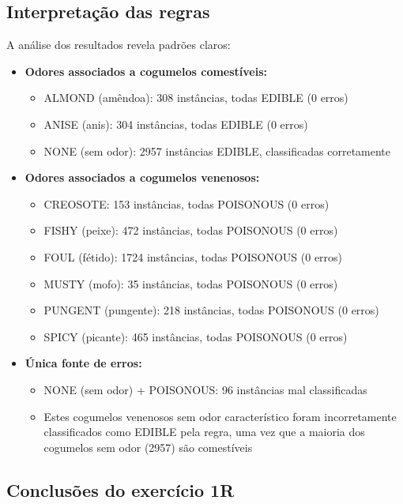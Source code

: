 \documentclass[12pt,a4paper]{article}
\begin{document}
\subsection{Interpretação das regras}

A análise dos resultados revela padrões claros:

\begin{itemize}
    \item \textbf{Odores associados a cogumelos comestíveis:}
    \begin{itemize}
        \item ALMOND (amêndoa): 308 instâncias, todas EDIBLE (0 erros)
        \item ANISE (anis): 304 instâncias, todas EDIBLE (0 erros)
        \item NONE (sem odor): 2957 instâncias EDIBLE, classificadas corretamente
    \end{itemize}
    
    \item \textbf{Odores associados a cogumelos venenosos:}
    \begin{itemize}
        \item CREOSOTE: 153 instâncias, todas POISONOUS (0 erros)
        \item FISHY (peixe): 472 instâncias, todas POISONOUS (0 erros)
        \item FOUL (fétido): 1724 instâncias, todas POISONOUS (0 erros)
        \item MUSTY (mofo): 35 instâncias, todas POISONOUS (0 erros)
        \item PUNGENT (pungente): 218 instâncias, todas POISONOUS (0 erros)
        \item SPICY (picante): 465 instâncias, todas POISONOUS (0 erros)
    \end{itemize}
    
    \item \textbf{Única fonte de erros:}
    \begin{itemize}
        \item NONE (sem odor) + POISONOUS: 96 instâncias mal classificadas
        \item Estes cogumelos venenosos sem odor característico foram incorretamente classificados como EDIBLE pela regra, uma vez que a maioria dos cogumelos sem odor (2957) são comestíveis
    \end{itemize}
\end{itemize}

\subsection{Conclusões do exercício 1R}
\end{document}
